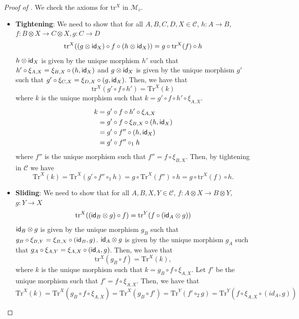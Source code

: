 \begin{proof}[Proof of ]
  We check the axioms for $\text{tr}^{X}$ in $\mathcal{M}_{c}$.
  \begin{itemize}
    \item \textbf{Tightening}: We need to show that for all $A,B,C,D,X \in \mathcal{C}$, $h : A \to B$, $f : B \otimes X \to C \otimes X, g : C \to D$
    \[
    \text{tr}^{X}((g \otimes \textsf{id}_{X}) \circ f \circ (h \otimes \textsf{id}_{X})) = g \circ \text{tr}^{X}(f) \circ h
    \]
    $h \otimes \textsf{id}_{X}$ is given by the unique morphism $h'$ such that $h' \circ \xi_{A,X} = \xi_{B,X} \circ (h, \textsf{id}_{X})$ and $g \otimes \textsf{id}_{X}$ is given by the unique morphism $g'$ such that $g' \circ \xi_{C,X} = \xi_{D,X} \circ (g, \textsf{id}_{X})$.
    Then, we have that 
    \[
    \text{tr}^{X}(g' \circ f \circ h') = \text{Tr}^{X}(k)
    \]
    where $k$ is the unique morphism such that $k = g' \circ f \circ h' \circ \xi_{A,X}$.
    \begin{align*}
      k &= g' \circ f \circ h' \circ \xi_{A,X}\\
      &= g' \circ f \circ \xi_{B,X} \circ (h, \textsf{id}_{X})\\
      &= g' \circ f'' \circ (h, \textsf{id}_{X})\\
      &= g' \circ f'' \circ_{1} h\\
    \end{align*}
    where $f''$ is the unique morphism such that $f'' = f \circ \xi_{B,X}$.
    Then, by tightening in $\mathcal{C}$ we have
    \[
    \text{Tr}^{X}(k) = \text{Tr}^{X}(g' \circ f'' \circ_{1} h) = g \circ \text{Tr}^{X}(f'') \circ h = g \circ \text{tr}^{X}(f) \circ h.
    \]
    \item \textbf{Sliding}: We need to show that for all $A,B,X,Y \in \mathcal{C}$, $f : A \otimes X \to B \otimes Y$, $g : Y \to X$
    \[
    \text{tr}^{X}((\textsf{id}_{B} \otimes g) \circ f) = \text{tr}^{Y}(f \circ (\textsf{id}_{A} \otimes g))
    \]
    $\textsf{id}_{B} \otimes g$ is given by the unique morphism $g_{B}$ such that $g_{B} \circ \xi_{B,Y} = \xi_{B,X} \circ (\textsf{id}_{B}, g)$.
    $\textsf{id}_{A} \otimes g$ is given by the unique morphism $g_{A}$ such that $g_{A} \circ \xi_{A,Y} = \xi_{A,X} \circ (\textsf{id}_{A}, g)$.
    Then, we have that
    \[
    \text{tr}^{X}(g_{B} \circ f) = \text{Tr}^{X}(k),
    \]
    where $k$ is the unique morphism such that $k = g_{B} \circ f \circ \xi_{A,X}$.
    Let $f'$ be the unique morphism such that $f' = f \circ \xi_{A,X}$.
    Then, we have that
    \[
    \text{Tr}^{X}(k) = \text{Tr}^{X}(g_{B} \circ f \circ \xi_{A,X}) = \text{Tr}^{X}(g_{B} \circ f') = \text{Tr}^{Y}(f' \circ_{2} g) = \text{Tr}^{Y}(f \circ \xi_{A,X} \circ (id_{A}, g))
\]
\end{itemize}
\end{proof}
